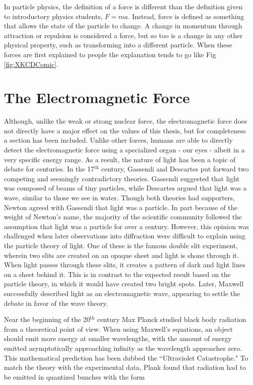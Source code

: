 In particle physics, the definition of a force is different than the definition given to introductory physics students, $F=ma$. Instead, force is defined as something that allows the state of the particle to change. A change in momentum through attraction or repulsion is considered a force, but so too is a change in any other physical property, such as transforming into a different particle. When these forces are first explained to people the explanation tends to go like Fig \ref{fig:XKCDComic}. 


\section{The Electromagnetic Force}
Although, unlike the weak or strong nuclear force, the electromagnetic force does not directly have a major effect on the values of this thesis, but for completeness a section has been included. Unlike other forces, humans are able to directly detect the electromagnetic force using a specialized organ - our eyes - albeit in a very specific energy range. As a result, the nature of light has been a topic of debate for centuries. In the 17$^\text{th}$ century, Gassendi and Descartes put forward two competing and seemingly contradictory theories. Gassendi suggested that light was composed of beams of tiny particles, while Descartes argued that light was a wave, similar to those we see in water. Though both theories had supporters, Newton agreed with Gassendi that light was a particle. In part because of the weight of Newton's name, the majority of the scientific community followed the assumption that light was a particle for over a century. However, this opinion was challenged when later observations into diffraction were difficult to explain using the particle theory of light. One of these is the famous double slit experiment, wherein two slits are created on an opaque sheet and light is shone through it. When light passes through these slits, it creates a pattern of dark and light lines on a sheet behind it. This is in contrast to the expected result based on the particle theory, in which it would have created two bright spots. Later, Maxwell successfully described light as an electromagnetic wave, appearing to settle the debate in favor of the wave theory\cite{LightHistory}.\par
Near the beginning of the 20$^\text{th}$ century Max Planck studied black body radiation from a theoretical point of view. When using Maxwell's equations, an object should emit more energy at smaller wavelengths, with the amount of energy emitted asymptotically approaching infinity as the wavelength approaches zero.  This mathematical prediction has been dubbed the ``Ultraviolet Catastrophe." To match the theory with the experimental data, Plank found that radiation had to be emitted in quantized bunches with the form 
